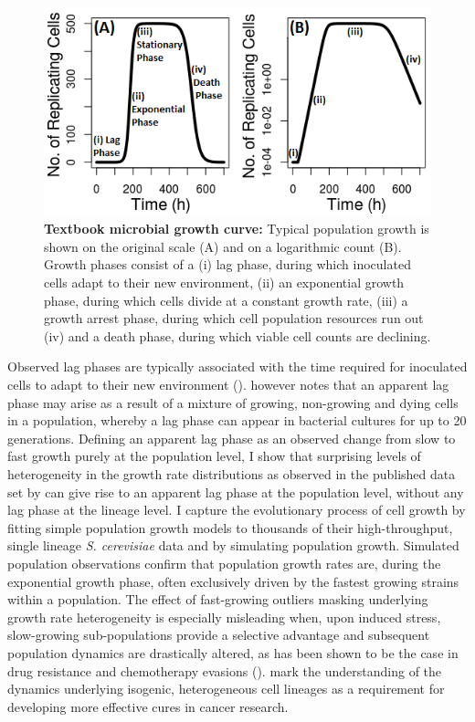 \documentclass{bioinfo}
\begin{document}
\vspace{-2em}
\begin{figure}[H]
\includegraphics[width=1\linewidth]{Ch1TextbookGrowth.png}
\vspace{-2.5em}
\caption{\footnotesize{\textbf{Textbook microbial growth curve:} Typical population growth is shown on the original scale (A) and on a logarithmic count (B). Growth phases consist of a (i) lag phase, during which inoculated cells adapt to their new environment, (ii) an exponential growth phase, during which cells divide at a constant growth rate, (iii) a growth arrest phase, during which cell population resources run out (iv) and a death phase, during which viable cell counts are declining.}}
\label{fig:GrowthPhases}
\end{figure}
\vspace{-3em}

Observed lag phases are typically associated with the time required for inoculated cells to adapt to their new environment (\citealp{Rolfe11}). \cite{Pirt75} however notes that an apparent lag phase may arise as a result of a mixture of growing, non-growing and dying cells in a population, whereby a lag phase can appear in bacterial cultures for up to 20 generations. Defining an apparent lag phase as an observed change from slow to fast growth purely at the population level, I show that surprising levels of heterogeneity in the growth rate distributions as observed in the published data set by \cite{Levy12} can give rise to an apparent lag phase at the population level, without any lag phase at the lineage level. I capture the evolutionary process of cell growth by fitting simple population growth models to thousands of their high-throughput, single lineage \textit{S. cerevisiae} data and by simulating population growth. Simulated population observations confirm that population growth rates are, during the exponential growth phase, often exclusively driven by the fastest growing strains within a population. The effect of fast-growing outliers masking underlying growth rate heterogeneity is especially misleading when, upon induced stress, slow-growing sub-populations provide a selective advantage and subsequent population dynamics are drastically altered, as has been shown to be the case in drug resistance and chemotherapy evasions (\citealp{Balaban13,Marusyk12}). \cite{Tabassum15} mark the understanding of the dynamics underlying isogenic, heterogeneous cell lineages as a requirement for developing more effective cures in cancer research.
\end{document}
